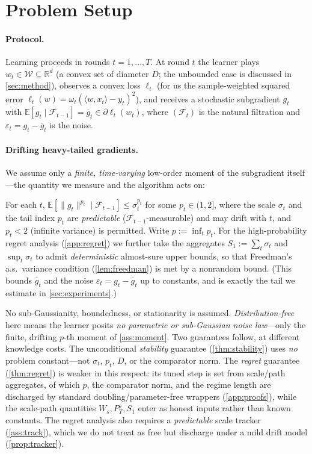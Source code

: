 \documentclass{article}
\newcommand{\E}{\mathbb{E}}
\newcommand{\R}{\mathbb{R}}
\newcommand{\ip}[2]{\langle #1, #2 \rangle}
\newcommand{\norm}[1]{\lVert #1 \rVert}
\newcommand{\gt}{g_t}
\begin{document}
\section{Problem Setup}
\label{sec:problem}

\paragraph{Protocol.} Learning proceeds in rounds $t=1,\dots,T$. At round $t$ the
learner plays $w_t\in\mathcal W\subseteq\R^d$ (a convex set of diameter $D$; the
unbounded case is discussed in \cref{sec:method}), observes a convex loss $\ell_t$
(for us the sample-weighted squared error $\ell_t(w)=\omega_t(\ip{w}{x_t}-y_t)^2$),
and receives a stochastic subgradient $\gt$ with
$\E[\gt\mid\mathcal F_{t-1}]=\bar g_t\in\partial\ell_t(w_t)$, where $(\mathcal F_t)$ is
the natural filtration and $\varepsilon_t=\gt-\bar g_t$ is the noise.

\paragraph{Drifting heavy-tailed gradients.} We assume only a \emph{finite, time-varying}
low-order moment of the subgradient itself---the quantity we measure and the algorithm
acts on:
\begin{assumption}
\label{ass:moment}
For each $t$, $\E[\norm{\gt}^{p_t}\mid\mathcal F_{t-1}]\le\sigma_t^{p_t}$
for some $p_t\in(1,2]$, where the scale $\sigma_t$ and the tail index $p_t$ are
\emph{predictable} ($\mathcal F_{t-1}$-measurable) and may drift with $t$, and $p_t<2$
(infinite variance) is permitted. Write $p:=\inf_t p_t$. For the high-probability regret
analysis (\cref{app:regret}) we further take the aggregates $S_1:=\sum_t\sigma_t$ and
$\sup_t\sigma_t$ to admit \emph{deterministic} almost-sure upper bounds, so that Freedman's
a.s.\ variance condition (\cref{lem:freedman}) is met by a nonrandom bound.
(This bounds $\bar g_t$ and the noise $\varepsilon_t=\gt-\bar g_t$ up to constants, and
is exactly the tail we estimate in \cref{sec:experiments}.)
\end{assumption}
No sub-Gaussianity, boundedness, or stationarity is assumed. \emph{Distribution-free}
here means the learner posits \emph{no parametric or sub-Gaussian noise law}---only the
finite, drifting $p$-th moment of \cref{ass:moment}. Two guarantees follow, at different
knowledge costs. The unconditional \emph{stability} guarantee (\cref{thm:stability}) uses
\emph{no} problem constant---not $\sigma_t$, $p_t$, $D$, or the comparator norm. The
\emph{regret} guarantee (\cref{thm:regret}) is weaker in this respect: its tuned step is set
from scale/path aggregates, of which $p$, the comparator norm, and the regime length are
discharged by standard doubling/parameter-free wrappers (\cref{app:proofs}), while the
scale-path quantities $W_s,P_T^s,S_1$ enter as honest inputs rather than known constants. The
regret analysis also requires a \emph{predictable} scale tracker (\cref{ass:track}), which we
do not treat as free but discharge under a mild drift model (\cref{prop:tracker}).
\end{document}
